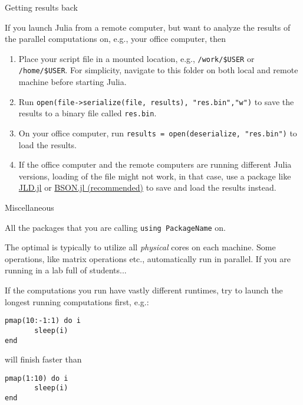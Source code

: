 \documentclass[10pt]{beamer}
\begin{document}
\begin{frame}{Getting results back}

If you launch Julia from a remote computer, but want to analyze the results of the parallel computations on, e.g., your office computer, then
\begin{enumerate}[<+->]
	\item Place your script file in a mounted location, e.g., \texttt{/work/\$USER} or \texttt{/home/\$USER}. For simplicity, navigate to this folder on both local and remote machine before starting Julia.
	\item Run \texttt{open(file->serialize(file, results), "res.bin","w")} to save the results to a binary file called \texttt{res.bin}.
	\item On your office computer, run \texttt{results = open(deserialize, "res.bin")} to load the results.
    \item If the office computer and the remote computers are running different Julia versions, loading of the file might not work, in that case, use a package like \href{https://github.com/JuliaIO/JLD.jl}{JLD.jl} or \href{https://github.com/MikeInnes/BSON.jl}{BSON.jl (recommended)} to save and load the results instead.
\end{enumerate}
\end{frame}



\begin{frame}[fragile]{Miscellaneous}
\begin{description}[<+->]
	\item[How to figure out which packages to install on remote computers] All the packages that you are calling \texttt{using PackageName} on.
	\item[How many workers to launch] The optimal is typically to utilize all \emph{physical} cores on each machine. Some operations, like matrix operations etc., automatically run in parallel. If you are running in a lab full of students...
	\item[Order of computations] If the computations you run have vastly different runtimes, try to launch the longest running computations first, e.g.:
	\begin{verbatim}
pmap(10:-1:1) do i
       sleep(i)
end
	\end{verbatim}
	will finish faster than
	\begin{verbatim}
pmap(1:10) do i
       sleep(i)
end
	\end{verbatim}
\end{description}
\end{frame}
\end{document}
